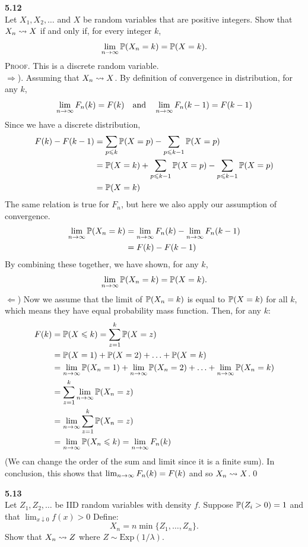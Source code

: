 \newpage\noindent
\textbf{5.12}\\  %
Let $X_1,X_2,\ldots$ and $X$ be random variables that are positive integers.
Show that $X_n\raD X$ if and only if, for every integer $k$,
$$
\lim_{n\ra\infty} \P(X_n = k) = \P(X = k).
$$
\textsc{Proof}. This is a discrete random variable.\\
$\Rightarrow$). Assuming that $X_n\raD X$. By definition of convergence in distribution,
for any $k$,
$$
\lim_{n\ra\infty} F_n(k) = F(k)
\quad\text{and}\quad
\lim_{n\ra\infty} F_n(k-1) = F(k-1)
$$
Since we have a discrete distribution,
\begin{align*}
    F(k) - F(k-1)
    &= \sum_{p\leq k}\P(X=p) - \sum_{p\leq k-1}\P(X=p) \\
    &= \P(X=k) + \sum_{p\leq k-1}\P(X=p) - \sum_{p\leq k-1}\P(X=p) \\
    &= \P(X=k)
\end{align*}
The same relation is true for $F_n$, but here we also apply our assumption of convergence.
\begin{align*}
    \lim_{n\ra\infty}\P(X_n=k) &= \lim_{n\ra\infty}F_n(k) - \lim_{n\ra\infty}F_n(k-1) \\
    &= F(k) - F(k-1)
\end{align*}
By combining these together, we have shown, for any $k$,
$$
\lim_{n\ra\infty}\P(X_n=k) = \P(X=k).
$$
$\Leftarrow$) Now we assume that the limit of $\P(X_n = k)$ is equal to $\P(X = k)$ for all $k$,
which means they have equal probability mass function. Then, for any $k$:
\begin{align*}
    F(k) &= \P(X\leq k) = \sum_{z=1}^k\P(X = z) \\
    &= \P(X = 1) + \P(X = 2) + \ldots + \P(X = k) \\
    &= \lim_{n\ra\infty}\P(X_n = 1) + \lim_{n\ra\infty}\P(X_n = 2) + \ldots + \lim_{n\ra\infty}\P(X_n = k) \\
    &= \sum_{z=1}^k\lim_{n\ra\infty}\P(X_n = z) \\
    &= \lim_{n\ra\infty}\sum_{z=1}^k\P(X_n = z) \\
    &= \lim_{n\ra\infty} \P(X_n\leq k) = \lim_{n\ra\infty} F_n(k)
\end{align*}
(We can change the order of the sum and limit since it is a finite sum).
In conclusion, this shows that $\lim_{n\ra\infty} F_n(k) = F(k)$ and so $X_n\raD X$.\qed

\bigskip\noindent
\textbf{5.13}\\  %
Let $Z_1,Z_2,\ldots$ be IID random variables with density $f$. Suppose
$\P(Z_i > 0) = 1$ and that $\lim_{x\downarrow 0}f(x) > 0$ Define:
$$
X_n = n\min\{Z_1,\ldots, Z_n\}.
$$
Show that $X_n\raD Z$ where $Z\sim\text{Exp}(1/\lambda)$.


